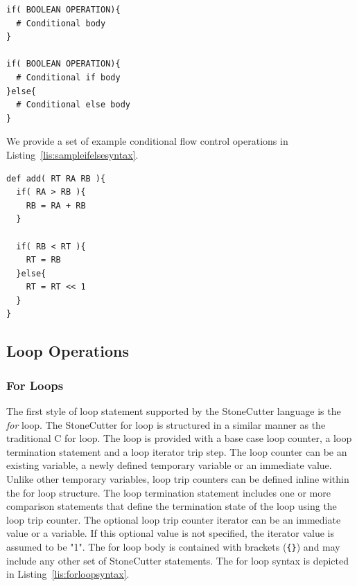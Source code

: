 \documentclass{article}
\begin{document}
\vspace{0.125in}
\begin{lstlisting}[frame=single,style=base,caption={Flow Control Syntax},captionpos=b,label={lis:ifelsesyntax}]
if( BOOLEAN OPERATION){
  # Conditional body
}

if( BOOLEAN OPERATION){
  # Conditional if body
}else{
  # Conditional else body
}
\end{lstlisting}

We provide a set of example conditional flow control operations in Listing~\ref{lis:sampleifelsesyntax}.  

\vspace{0.125in}
\begin{lstlisting}[frame=single,style=base,caption={Sample If-Else Syntax},captionpos=b,label={lis:sampleifelsesyntax}]
def add( RT RA RB ){
  if( RA > RB ){
    RB = RA + RB
  }
  
  if( RB < RT ){
    RT = RB
  }else{
    RT = RT << 1
  }
}
\end{lstlisting}

\clearpage
\subsection{Loop Operations}
\label{sec:LoopOperations}

\subsubsection{For Loops}
\label{sec:ForLoops}

The first style of loop statement supported by the StoneCutter language is the 
\textit{for} loop.  The StoneCutter for loop is structured in a similar manner as the 
traditional C for loop.  The loop is provided with a base case loop counter, a loop 
termination statement and a loop iterator trip step.  The loop counter 
can be an existing variable, a newly defined temporary variable or an immediate value.  Unlike other 
temporary variables, loop trip counters can be defined inline within the for loop 
structure.  The loop termination statement includes one or more comparison 
statements that define the termination state of the loop using the loop trip 
counter.  The optional loop trip counter iterator can be an immediate value or a variable.  
If this optional value is not specified, the iterator value is assumed to be "1".  The for loop body 
is contained with brackets (\texttt{\{\}}) and may include any other set of StoneCutter statements.  The for loop 
syntax is depicted in Listing~\ref{lis:forloopsyntax}.     
\end{document}
